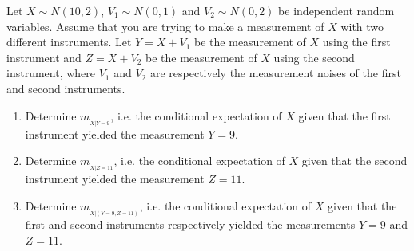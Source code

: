 \item
Let $X \sim N(10,2)$, $V_1 \sim N(0,1)$ and $V_2 \sim N(0,2)$ be independent random variables. Assume that you are trying to make a measurement of $X$ with two different instruments. Let  $Y = X + V_1$ be the measurement of $X$ using the first instrument and $Z = X + V_2$ be the measurement of $X$ using the second instrument, where $V_1$ and $V_2$ are respectively the measurement noises of the first and second instruments.

\begin{enumerate}

\item
Determine $m_{_{X|Y=9}}$, i.e. the conditional expectation of $X$ given that the first instrument yielded the measurement $Y=9$.

\item
Determine $m_{_{X|Z=11}}$, i.e. the conditional expectation of $X$ given that the second instrument yielded the measurement $Z=11$.

\item
Determine $m_{_{X|(Y=9,Z=11)}}$, i.e. the conditional expectation of $X$ given that the first and second instruments respectively yielded the measurements $Y=9$ and $Z=11$.

\end{enumerate} 
